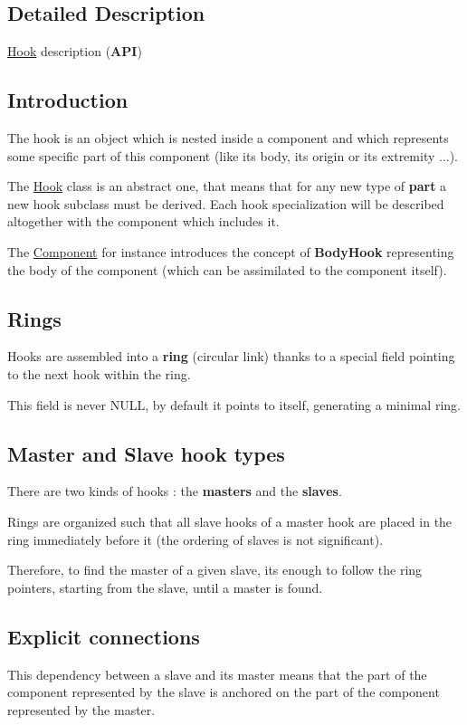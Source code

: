 \subsection{Detailed Description}
\hyperlink{classHurricane_1_1Hook}{Hook} description ({\bfseries A\+PI}) 

\hypertarget{classHurricane_1_1Hook_secHookIntro}{}\subsection{Introduction}\label{classHurricane_1_1Hook_secHookIntro}
The hook is an object which is nested inside a component and which represents some specific part of this component (like its body, its origin or its extremity ...).

The \hyperlink{classHurricane_1_1Hook}{Hook} class is an abstract one, that means that for any new type of {\bfseries part} a new hook subclass must be derived. Each hook specialization will be described altogether with the component which includes it.

The \hyperlink{classHurricane_1_1Component}{Component} for instance introduces the concept of {\bfseries Body\+Hook} representing the body of the component (which can be assimilated to the component itself).\hypertarget{classHurricane_1_1Hook_secHookRings}{}\subsection{Rings}\label{classHurricane_1_1Hook_secHookRings}
Hooks are assembled into a {\bfseries ring} (circular link) thanks to a special field pointing to the next hook within the ring.

This field is never N\+U\+LL, by default it points to itself, generating a minimal ring.\hypertarget{classHurricane_1_1Hook_secHookMasterAndSlaveHookTypes}{}\subsection{Master and Slave hook types}\label{classHurricane_1_1Hook_secHookMasterAndSlaveHookTypes}
There are two kinds of hooks \+: the {\bfseries masters} and the {\bfseries slaves}.

Rings are organized such that all slave hooks of a master hook are placed in the ring immediately before it (the ordering of slaves is not significant).

Therefore, to find the master of a given slave, it\textquotesingle{}s enough to follow the ring pointers, starting from the slave, until a master is found.\hypertarget{classHurricane_1_1Hook_secHookExplicitConnections}{}\subsection{Explicit connections}\label{classHurricane_1_1Hook_secHookExplicitConnections}
This dependency between a slave and its master means that the part of the component represented by the slave is anchored on the part of the component represented by the master.


